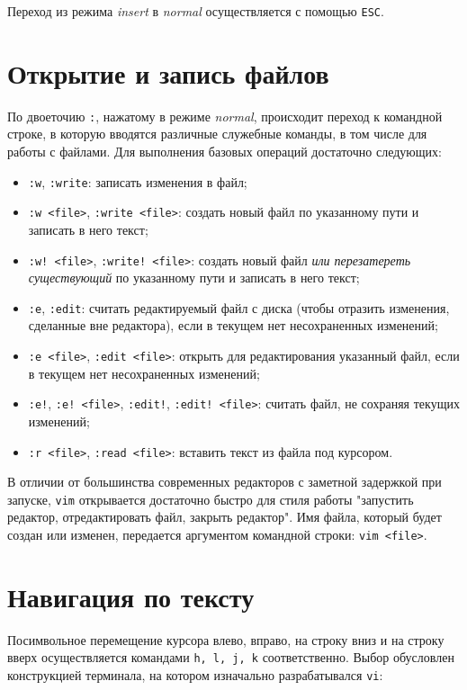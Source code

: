 \documentclass[listings]{labreport}
\begin{document}
Переход из режима \textit{insert} в \textit{normal} осуществляется с помощью
\texttt{ESC}.

\section*{Открытие и запись файлов}

По двоеточию \texttt{:}, нажатому в режиме \textit{normal}, происходит
переход к командной строке, в которую вводятся различные служебные команды,
в том числе для работы с файлами. Для выполнения базовых операций достаточно
следующих:

\begin{itemize}
\item \texttt{:w}, \texttt{:write}: записать изменения в файл;
\item \texttt{:w <file>}, \texttt{:write <file>}: создать новый файл
  по указанному пути и записать в него текст;
\item \texttt{:w! <file>}, \texttt{:write! <file>}: создать новый файл
  \textit{или перезатереть существующий} по указанному пути и записать в него текст;
\item \texttt{:e}, \texttt{:edit}: считать редактируемый файл с диска (чтобы
  отразить изменения, сделанные вне редактора), если в текущем нет несохраненных изменений;
\item \texttt{:e <file>}, \texttt{:edit <file>}: открыть для редактирования
  указанный файл, если в текущем нет несохраненных изменений;
\item \texttt{:e!}, \texttt{:e! <file>}, \texttt{:edit!}, \texttt{:edit! <file>}:
  считать файл, не сохраняя текущих изменений;
\item \texttt{:r <file>}, \texttt{:read <file>}: вставить текст из файла под курсором.
\end{itemize}

В отличии от большинства современных редакторов с заметной задержкой при запуске,
\texttt{vim} открывается достаточно быстро для стиля работы "запустить
редактор, отредактировать файл, закрыть редактор". Имя файла, который будет создан или изменен,
передается аргументом командной строки: \texttt{vim <file>}.

\section*{Навигация по тексту}

Посимвольное перемещение курсора влево, вправо, на строку вниз и на строку вверх
осуществляется командами \texttt{h, l, j, k} соответственно. Выбор обусловлен
конструкцией терминала, на котором изначально разрабатывался \texttt{vi}:
\end{document}
